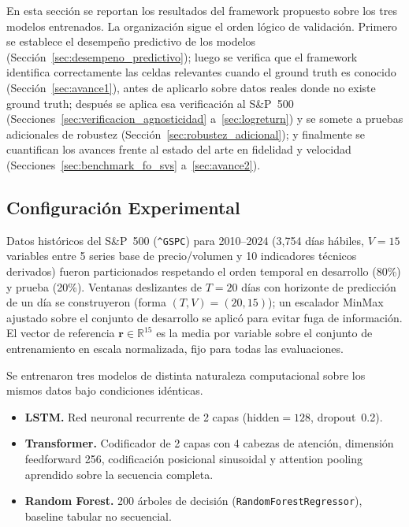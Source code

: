 \documentclass[conference, letterpaper]{IEEEtran}
\begin{document}
En esta sección se reportan los resultados del framework propuesto
sobre los tres modelos entrenados. La organización sigue el orden
lógico de validación. Primero se establece el desempeño predictivo
de los modelos (Sección~\ref{sec:desempeno_predictivo}); luego se
verifica que el framework identifica correctamente las celdas
relevantes cuando el ground truth es conocido
(Sección~\ref{sec:avance1}), antes de aplicarlo sobre datos reales
donde no existe ground truth; después se aplica esa verificación al
S\&P~500 (Secciones~\ref{sec:verificacion_agnosticidad}
a~\ref{sec:logreturn}) y se somete a pruebas adicionales de robustez
(Sección~\ref{sec:robustez_adicional}); y finalmente se cuantifican
los avances frente al estado del arte en fidelidad y velocidad
(Secciones~\ref{sec:benchmark_fo_svs} a~\ref{sec:avance2}).

\subsection{Configuración Experimental}

Datos históricos del S\&P~500 (\texttt{\^{}GSPC}) para 2010--2024
(3{,}754 días hábiles, $V{=}15$ variables entre 5 series base de
precio/volumen y 10 indicadores técnicos derivados) fueron
particionados respetando el orden temporal en desarrollo (80\%) y
prueba (20\%). Ventanas deslizantes de $T{=}20$ días con horizonte
de predicción de un día se construyeron (forma $(T,V){=}(20,15)$);
un escalador MinMax ajustado sobre el conjunto de desarrollo se
aplicó para evitar fuga de información. El vector de referencia
$\mathbf{r}{\in}\mathbb{R}^{15}$ es la media por variable sobre el
conjunto de entrenamiento en escala normalizada, fijo para todas las
evaluaciones.

Se entrenaron tres modelos de distinta naturaleza computacional sobre
los mismos datos bajo condiciones idénticas.

\begin{itemize}
  \item \textbf{LSTM.} Red neuronal recurrente de 2 capas
    ($\text{hidden}{=}128$, dropout~0.2).
  \item \textbf{Transformer.} Codificador de 2 capas con 4 cabezas
    de atención, dimensión feedforward 256, codificación posicional
    sinusoidal y attention pooling aprendido sobre la secuencia completa.
  \item \textbf{Random Forest.} 200 árboles de decisión
    (\texttt{RandomForestRegressor}), baseline tabular no secuencial.
\end{itemize}
\end{document}
